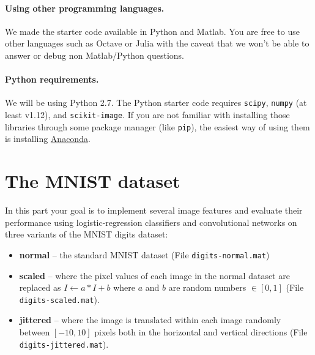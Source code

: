 \documentclass[10pt,letterpaper]{article}
\newcommand{\cmd}[1] {{\color{blue}\texttt{#1}}}
\begin{document}
\paragraph{Using other programming languages.} We made the starter code available in Python and Matlab. You are free to use other languages such as Octave or Julia with the caveat that we won't be able to answer or debug non Matlab/Python questions.

\paragraph{Python requirements.} We will be using Python 2.7. The Python starter code requires \cmd{scipy}, \cmd{numpy} (at least v1.12), and \cmd{scikit-image}.
If you are not familiar with installing those libraries through some package manager (like \cmd{pip}), the easiest way of using them is installing \href{https://docs.anaconda.com/anaconda/install/}{Anaconda}.




\newpage


\section*{The MNIST dataset}
In this part your goal is to implement several image
features and evaluate their performance using logistic-regression classifiers and
convolutional networks on three variants of the MNIST digits dataset:

\begin{itemize}
\item \textbf{normal} -- the standard MNIST dataset (File \cmd{digits-normal.mat})
\item \textbf{scaled} -- where the pixel values of each image in the normal dataset are replaced as $I \leftarrow a*I + b$ where $a$ and $b$ are random numbers $\in [0,1]$ (File \cmd{digits-scaled.mat}). 
\item \textbf{jittered} -- where the image is translated within each image randomly between $[-10,10]$ pixels both in the horizontal and vertical directions (File \cmd{digits-jittered.mat}).
\end{itemize}
\end{document}

